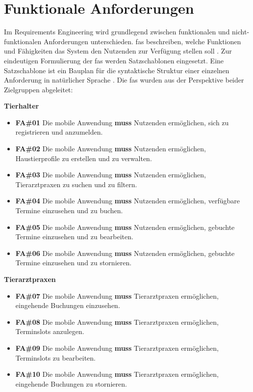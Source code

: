 \section{Funktionale Anforderungen}

Im Requirements Engineering wird grundlegend zwischen funktionalen und nicht-funktionalen Anforderungen unterschieden. \gls{fas} beschreiben, welche Funktionen und Fähigkeiten das System den Nutzenden zur Verfügung stellen soll \cite[S.~3]{pohl2021}. Zur eindeutigen Formulierung der \gls{fas} werden Satzschablonen eingesetzt. Eine Satzschablone ist ein Bauplan für die syntaktische Struktur einer einzelnen Anforderung in natürlicher Sprache \cite[S.~71]{pohl2021}. Die \gls{fas} wurden aus der 
Perspektive beider Zielgruppen abgeleitet:

\textbf{Tierhalter}

\begin{itemize}
    \item \textbf{FA\#01} Die mobile Anwendung \textbf{muss} Nutzenden ermöglichen, sich zu registrieren und anzumelden.

    \item \textbf{FA\#02} Die mobile Anwendung \textbf{muss} Nutzenden ermöglichen, Haustierprofile zu erstellen und zu verwalten.

    \item \textbf{FA\#03} Die mobile Anwendung \textbf{muss} Nutzenden ermöglichen, Tierarztpraxen zu suchen und zu filtern.

    \item \textbf{FA\#04} Die mobile Anwendung \textbf{muss} Nutzenden ermöglichen, verfügbare Termine einzusehen und zu buchen.

    \item \textbf{FA\#05} Die mobile Anwendung \textbf{muss} Nutzenden ermöglichen, gebuchte Termine einzusehen und zu bearbeiten.

    \item \textbf{FA\#06} Die mobile Anwendung \textbf{muss} Nutzenden ermöglichen, gebuchte Termine einzusehen und zu stornieren.
\end{itemize}

\textbf{Tierarztpraxen}

\begin{itemize}
    \item \textbf{FA\#07} Die mobile Anwendung \textbf{muss} 
    Tierarztpraxen ermöglichen, eingehende Buchungen einzusehen.

    \item \textbf{FA\#08} Die mobile Anwendung \textbf{muss}
    Tierarztpraxen ermöglichen, Terminslots anzulegen.

    \item \textbf{FA\#09} Die mobile Anwendung \textbf{muss}
    Tierarztpraxen ermöglichen, Terminslots zu bearbeiten.

    \item \textbf{FA\#10} Die mobile Anwendung \textbf{muss}
    Tierarztpraxen ermöglichen, eingehende Buchungen zu stornieren.
\end{itemize}


